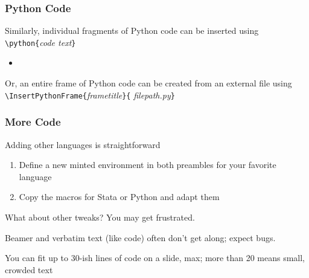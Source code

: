 \documentclass[aspectratio=169,handout]{beamer}
\begin{document}
\begin{frame}
	\frametitle{Python Code}
	\begin{witem}
		\item Similarly, individual fragments of Python code can be
			inserted using \texttt{\textbackslash{}python\{}\textit{code text}\texttt{\}}
			\begin{itemize}
				\item {}
			\end{itemize}
		\item Or, an entire frame of Python code can be created from an external file
			using
			\texttt{\textbackslash{}InsertPythonFrame\{}\textit{frametitle}\texttt{\}\{}
\textit{filepath.py}\texttt{\}}
	\end{witem}
\end{frame}






\begin{frame}
	\frametitle{More Code}
	\begin{witem}
		\item Adding other languages is straightforward
			\begin{enumerate}
				\item Define a new minted environment
					in both preambles for your favorite language
				\item Copy the macros for Stata or Python and adapt them
			\end{enumerate}
		\item What about other tweaks? You may get frustrated.
		\item Beamer and verbatim text (like code) often don't get along; expect bugs.
		\item You can fit up to 30-ish lines of code on a slide, max; more than 20 means small, crowded text
	\end{witem}
\end{frame}




\end{document}

